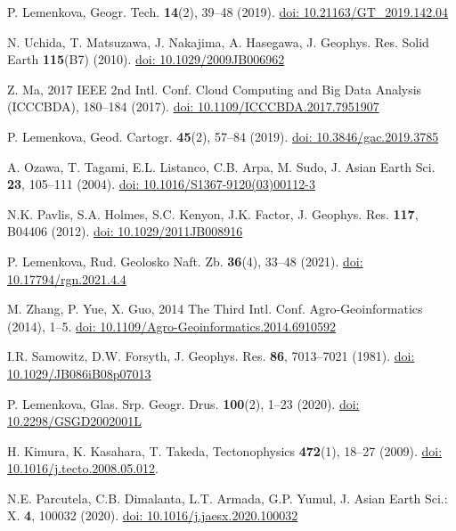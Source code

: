 \documentclass{rrparticle}
\begin{document}
\begin{thebibliography}{99}
 P. Lemenkova, Geogr. Tech. \textbf{14}(2), 39--48 (2019). \href{https://doi.org/10.21163/GT_2019.142.04}{doi: 10.21163/GT\_2019.142.04}

 N. Uchida, T. Matsuzawa, J. Nakajima, A. Hasegawa, J. Geophys. Res. Solid Earth \textbf{115}(B7) (2010). \href{https://doi.org/10.1029/2009JB006962}{doi: 10.1029/2009JB006962}

 Z. Ma, 2017 IEEE 2nd Intl. Conf. Cloud Computing and Big Data Analysis (ICCCBDA), 180--184 (2017). \href{https://doi.org/10.1109/ICCCBDA.2017.7951907}{doi: 10.1109/ICCCBDA.2017.7951907}

 P. Lemenkova, Geod. Cartogr. \textbf{45}(2), 57--84 (2019). \href{https://doi.org/10.3846/gac.2019.3785}{doi: 10.3846/gac.2019.3785}

 A. Ozawa, T. Tagami, E.L. Listanco, C.B. Arpa, M. Sudo, J. Asian Earth Sci. \textbf{23}, 105--111 (2004). \href{https://doi.org/10.1016/S1367-9120(03)00112-3}{doi: 10.1016/S1367-9120(03)00112-3}

 N.K. Pavlis, S.A. Holmes, S.C. Kenyon, J.K. Factor, J. Geophys. Res. \textbf{117}, B04406 (2012). \href{https://doi.org/10.1029/2011JB008916}{doi: 10.1029/2011JB008916}

 P. Lemenkova, Rud. Geolosko Naft. Zb. \textbf{36}(4), 33--48 (2021). \href{https://doi.org/10.17794/rgn.2021.4.4}{doi: 10.17794/rgn.2021.4.4}

 M. Zhang, P. Yue, X. Guo, 2014 The Third Intl. Conf. Agro-Geoinformatics (2014), 1--5.  \href{https://doi.org/10.1109/Agro-Geoinformatics.2014.6910592}{doi: 10.1109/Agro-Geoinformatics.2014.6910592}

 I.R. Samowitz, D.W. Forsyth, J. Geophys. Res. \textbf{86}, 7013--7021 (1981). \href{https://doi.org/10.1029/JB086iB08p07013}{doi: 10.1029/JB086iB08p07013}

 P. Lemenkova, Glas. Srp. Geogr. Drus. \textbf{100}(2), 1--23 (2020). \href{https://doi.org/10.2298/GSGD2002001L}{doi: 10.2298/GSGD2002001L}

 H. Kimura, K. Kasahara, T. Takeda, Tectonophysics \textbf{472}(1), 18--27 (2009). \href{https://doi.org/10.1016/j.tecto.2008.05.012}{doi: 10.1016/j.tecto.2008.05.012}.

 N.E. Parcutela, C.B. Dimalanta, L.T. Armada, G.P. Yumul, J. Asian Earth Sci.: X. \textbf{4}, 100032 (2020). \href{https://doi.org/10.1016/j.jaesx.2020.100032}{doi: 10.1016/j.jaesx.2020.100032}


\end{thebibliography}
\end{document}
